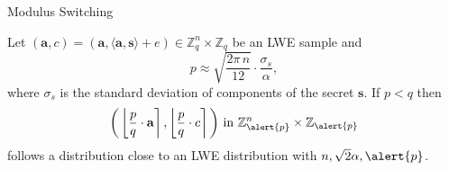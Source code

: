 \documentclass[10pt,compress]{beamer}
\renewcommand{\vec}[1]{\mathbf{#1}\xspace}
\newcommand{\ip}[2]{\left\langle{} {#1}, {#2} \right\rangle{}}
\newcommand{\pq}{\ensuremath{\frac{p}{q}}}
\renewcommand{\vec}[1]{\mathbf{#1}\xspace}
\newcommand{\Z}{\ensuremath{\mathbb{Z}}\xspace}
\newcommand{\round}[1]{\ensuremath{\left\lfloor{#1}\right\rceil}\xspace}
\begin{document}
\begin{frame}{Modulus Switching}
  \begin{alertblock}{}
    Let $(\vec{a},c) =(\vec{a}, \langle \vec{a}, \vec{s} \rangle + e) \in \Z_q^n \times \Z_q$ be an LWE sample and \[p \approx \sqrt{\frac{2\pi\, n}{12}} \cdot \frac{\sigma_s}{\alpha},\] where $\sigma_s$ is the standard deviation of components of the secret $\vec{s}$. If $p<q$ then $$\bigg(\round{\pq \cdot \vec{a}}, \round{\pq \cdot  c}\bigg) \textnormal{ in } \Z_{\alert{p}}^n \times \Z_{\alert{p}}$$ follows a distribution close to an LWE distribution with $n, \sqrt{2}\alpha, \alert{p}$.
  \end{alertblock}






\end{frame}
\end{document}
